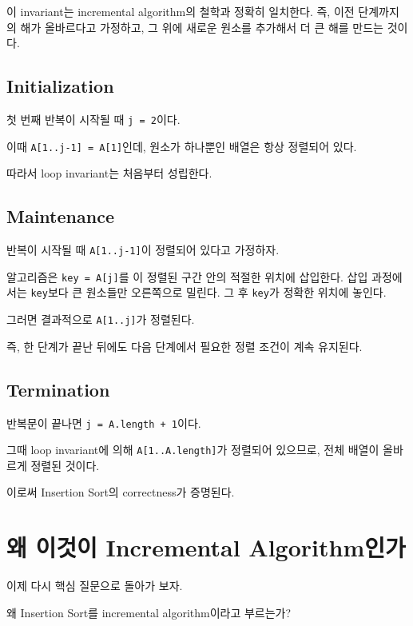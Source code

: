 \documentclass[
  korean,
]{article}
\begin{document}
이 invariant는 incremental algorithm의 철학과 정확히 일치한다. 즉, 이전
단계까지의 해가 올바르다고 가정하고, 그 위에 새로운 원소를 추가해서 더
큰 해를 만드는 것이다.

\subsection{Initialization}\label{initialization}

첫 번째 반복이 시작될 때 \texttt{j\ =\ 2}이다.

이때 \texttt{A{[}1..j-1{]}\ =\ A{[}1{]}}인데, 원소가 하나뿐인 배열은
항상 정렬되어 있다.

따라서 loop invariant는 처음부터 성립한다.

\subsection{Maintenance}\label{maintenance}

반복이 시작될 때 \texttt{A{[}1..j-1{]}}이 정렬되어 있다고 가정하자.

알고리즘은 \texttt{key\ =\ A{[}j{]}}를 이 정렬된 구간 안의 적절한 위치에
삽입한다. 삽입 과정에서는 \texttt{key}보다 큰 원소들만 오른쪽으로
밀린다. 그 후 \texttt{key}가 정확한 위치에 놓인다.

그러면 결과적으로 \texttt{A{[}1..j{]}}가 정렬된다.

즉, 한 단계가 끝난 뒤에도 다음 단계에서 필요한 정렬 조건이 계속
유지된다.

\subsection{Termination}\label{termination}

반복문이 끝나면 \texttt{j\ =\ A.length\ +\ 1}이다.

그때 loop invariant에 의해 \texttt{A{[}1..A.length{]}}가 정렬되어
있으므로, 전체 배열이 올바르게 정렬된 것이다.

이로써 Insertion Sort의 correctness가 증명된다.

\section{왜 이것이 Incremental
Algorithm인가}\label{uxc65c-uxc774uxac83uxc774-incremental-algorithmuxc778uxac00}

이제 다시 핵심 질문으로 돌아가 보자.

왜 Insertion Sort를 incremental algorithm이라고 부르는가?
\end{document}
